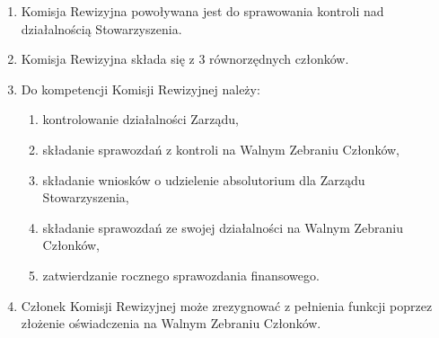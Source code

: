 \documentclass[a4paper,draft,10pt]{article}
\begin{document}
    \begin{enumerate}
	    \item Komisja Rewizyjna powoływana jest do sprawowania kontroli nad działalnością Stowarzyszenia.
	    \item Komisja Rewizyjna składa się z 3 równorzędnych członków.
	    \item Do kompetencji Komisji Rewizyjnej należy:
	      \begin{enumerate}
	        \item kontrolowanie działalności Zarządu,
	        \item składanie sprawozdań z kontroli na Walnym Zebraniu Członków,
	        \item składanie wniosków o udzielenie absolutorium dla Zarządu Stowarzyszenia,
	        \item składanie sprawozdań ze swojej działalności na Walnym Zebraniu Członków,
	        \item zatwierdzanie rocznego sprawozdania finansowego.
	      \end{enumerate}
	    \item Członek Komisji Rewizyjnej może zrezygnować z pełnienia funkcji poprzez złożenie oświadczenia na Walnym Zebraniu Członków.
	\end{enumerate}
\end{document}
